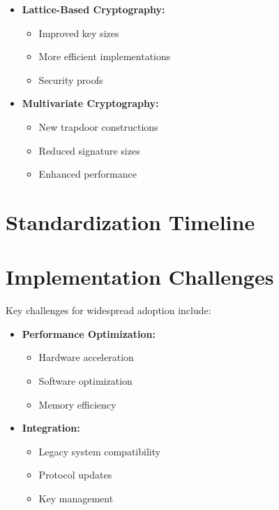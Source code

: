 \begin{itemize}
    \item \textbf{Lattice-Based Cryptography:}
    \begin{itemize}
        \item Improved key sizes
        \item More efficient implementations
        \item Security proofs
    \end{itemize}
    \item \textbf{Multivariate Cryptography:}
    \begin{itemize}
        \item New trapdoor constructions
        \item Reduced signature sizes
        \item Enhanced performance
    \end{itemize}
\end{itemize}

\section{Standardization Timeline}\label{sec:future_timeline}


\section{Implementation Challenges}\label{sec:challenges}

Key challenges for widespread adoption include:

\begin{itemize}
    \item \textbf{Performance Optimization:}
    \begin{itemize}
        \item Hardware acceleration
        \item Software optimization
        \item Memory efficiency
    \end{itemize}
    \item \textbf{Integration:}
    \begin{itemize}
        \item Legacy system compatibility
        \item Protocol updates
        \item Key management
    \end{itemize}
\end{itemize}

